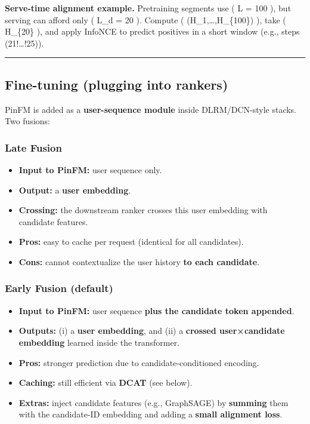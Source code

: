 \documentclass[
  letterpaper,
  DIV=11,
  numbers=noendperiod]{scrartcl}
\providecommand{\tightlist}{%
  \setlength{\itemsep}{0pt}\setlength{\parskip}{0pt}}
\begin{document}
\textbf{Serve-time alignment example.} Pretraining segments use ( L =
100 ), but serving can afford only ( L\_d = 20 ). Compute (
(H\_1,\dots,H\_\{100\}) ), take ( H\_\{20\} ), and apply InfoNCE to
predict positives in a short window (e.g., steps (21!\dots!25)).

\begin{center}\rule{0.5\linewidth}{0.5pt}\end{center}

\subsection{Fine-tuning (plugging into
rankers)}\label{fine-tuning-plugging-into-rankers}

PinFM is added as a \textbf{user-sequence module} inside DLRM/DCN-style
stacks. Two fusions:

\subsubsection{Late Fusion}\label{late-fusion}

\begin{itemize}
\tightlist
\item
  \textbf{Input to PinFM:} user sequence only.\\
\item
  \textbf{Output:} a \textbf{user embedding}.
\item
  \textbf{Crossing:} the downstream ranker crosses this user embedding
  with candidate features.
\item
  \textbf{Pros:} easy to cache per request (identical for all
  candidates).
\item
  \textbf{Cons:} cannot contextualize the user history \textbf{to each
  candidate}.
\end{itemize}

\subsubsection{Early Fusion (default)}\label{early-fusion-default}

\begin{itemize}
\tightlist
\item
  \textbf{Input to PinFM:} user sequence \textbf{plus the candidate
  token appended}.
\item
  \textbf{Outputs:} (i) a \textbf{user embedding}, and (ii) a
  \textbf{crossed user×candidate embedding} learned inside the
  transformer.
\item
  \textbf{Pros:} stronger prediction due to candidate-conditioned
  encoding.
\item
  \textbf{Caching:} still efficient via \textbf{DCAT} (see below).
\item
  \textbf{Extras:} inject candidate features (e.g., GraphSAGE) by
  \textbf{summing} them with the candidate-ID embedding and adding a
  \textbf{small alignment loss}.
\end{itemize}
\end{document}
